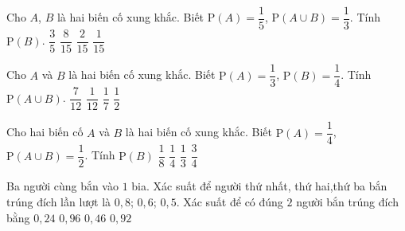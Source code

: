 \begin{ex}%
	Cho $A$, $B$ là hai biến cố xung khắc. Biết $\mathrm{P}(A)=\dfrac{1}{5}$, $\mathrm{P}(A\cup B)=\dfrac{1}{3}$. Tính $\mathrm{P}(B)$.
	\choice
	{$\dfrac{3}{5}$}
	{$\dfrac{8}{15}$}
	{\True $\dfrac{2}{15}$}
	{$\dfrac{1}{15}$}
\end{ex}

\begin{ex}%
	Cho $A$ và $B$ là hai biến cố xung khắc. Biết $\mathrm{P}(A)=\dfrac{1}{3}$, $\mathrm{P}(B)=\dfrac{1}{4}$. Tính $\mathrm{P}(A\cup B)$.
	\choice
	{\True $\dfrac{7}{12}$}
	{$\dfrac{1}{12}$}
	{$\dfrac{1}{7}$}
	{$\dfrac{1}{2}$}
\end{ex}

\begin{ex}%
	Cho hai biến cố $A$ và $B$ là hai biến cố xung khắc. Biết $\mathrm{P}(A)=\dfrac{1}{4}$, $\mathrm{P}(A\cup B)=\dfrac{1}{2}$. Tính $\mathrm{P}(B)$
	\choice
	{$\dfrac{1}{8}$}
	{\True $\dfrac{1}{4}$}
	{$\dfrac{1}{3}$}
	{$\dfrac{3}{4}$}
\end{ex}

\begin{ex}%
	Ba người cùng bắn vào $1$ bia. Xác suất để người thứ nhất, thứ hai,thứ ba bắn trúng đích lần lượt là $0{,}8$; $0{,}6$; $0{,}5$. Xác suất để có đúng $2$ người bắn trúng đích bằng
	\choice
	{$0{,}24$}
	{$0{,}96$}
	{\True $0{,}46$}
	{$0{,}92$}
\end{ex}

